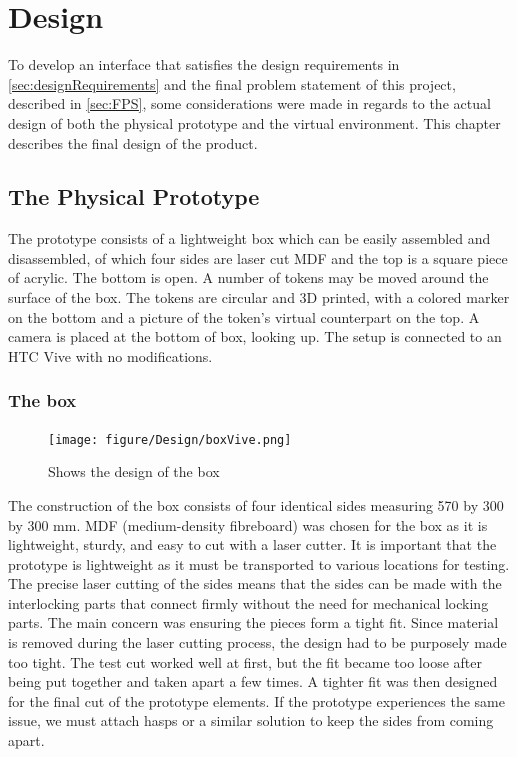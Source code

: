 \chapter{Design}
To develop an interface that satisfies the design requirements in \autoref{sec:designRequirements} and the final problem statement of this project, described in \autoref{sec:FPS}, some considerations were made in regards to the actual design of both the physical prototype and the virtual environment. This chapter describes the final design of the product.

\section{The Physical Prototype}

The prototype consists of a lightweight box which can be easily assembled and disassembled, of which four sides are laser cut MDF and the top is a square piece of acrylic. The bottom is open. A number of tokens may be moved around the surface of the box. The tokens are circular and 3D printed, with a colored marker on the bottom and a picture of the token's virtual counterpart on the top. A camera is placed at the bottom of box, looking up. 
The setup is connected to an HTC Vive with no modifications.

\subsection{The box}
\begin{figure}[H]
	\centering
	\texttt{[image: figure/Design/boxVive.png]}
	\caption{Shows the design of the box}
	\label{fig:boxVive}
\end{figure}

The construction of the box consists of four identical sides measuring 570 by 300 by 300 mm. MDF (medium-density fibreboard) was chosen for the box as it is lightweight, sturdy, and easy to cut with a laser cutter. It is important that the prototype is lightweight as it must be transported to various locations for testing. The precise laser cutting of the sides means that the sides can be made with the interlocking parts that connect firmly without the need for mechanical locking parts. The main concern was ensuring the pieces form a tight fit. Since material is removed during the laser cutting process, the design had to be purposely made too tight. The test cut worked well at first, but the fit became too loose after being put together and taken apart a few times. A tighter fit was then designed for the final cut of the prototype elements. If the prototype experiences the same issue, we must attach hasps or a similar solution to keep the sides from coming apart. 

